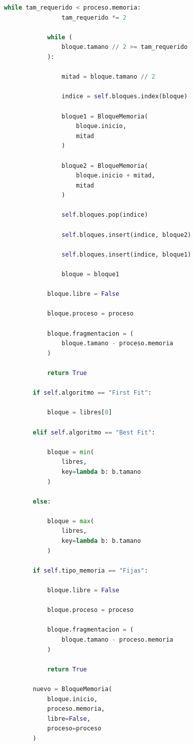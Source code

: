 \begin{lstlisting}[language=Python]
            while tam_requerido < proceso.memoria:
                tam_requerido *= 2

            while (
                bloque.tamano // 2 >= tam_requerido
            ):

                mitad = bloque.tamano // 2

                indice = self.bloques.index(bloque)

                bloque1 = BloqueMemoria(
                    bloque.inicio,
                    mitad
                )

                bloque2 = BloqueMemoria(
                    bloque.inicio + mitad,
                    mitad
                )

                self.bloques.pop(indice)

                self.bloques.insert(indice, bloque2)

                self.bloques.insert(indice, bloque1)

                bloque = bloque1

            bloque.libre = False

            bloque.proceso = proceso

            bloque.fragmentacion = (
                bloque.tamano - proceso.memoria
            )

            return True

        if self.algoritmo == "First Fit":

            bloque = libres[0]

        elif self.algoritmo == "Best Fit":

            bloque = min(
                libres,
                key=lambda b: b.tamano
            )

        else:

            bloque = max(
                libres,
                key=lambda b: b.tamano
            )

        if self.tipo_memoria == "Fijas":

            bloque.libre = False

            bloque.proceso = proceso

            bloque.fragmentacion = (
                bloque.tamano - proceso.memoria
            )

            return True

        nuevo = BloqueMemoria(
            bloque.inicio,
            proceso.memoria,
            libre=False,
            proceso=proceso
        )


\end{lstlisting}
